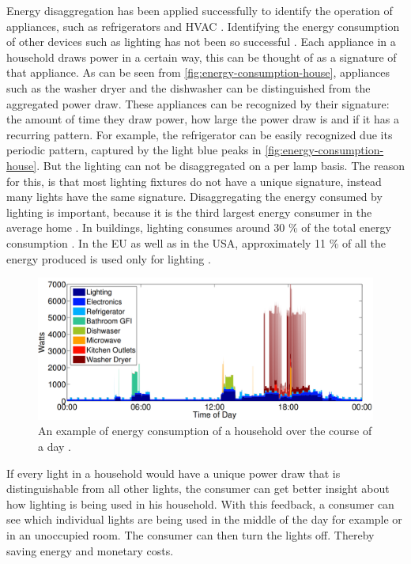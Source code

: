 Energy disaggregation has been applied successfully to identify the operation of appliances, such as refrigerators and HVAC \cite{kolter2011redd} \cite{spiegel2014energy}.
Identifying the energy consumption of other devices such as lighting has not been so successful \cite{spiegel2014energy} \cite{batra2015neighbourhood}.
Each appliance in a household draws power in a certain way, this can be thought of as a signature of that appliance.
As can be seen from \autoref{fig:energy-consumption-house}, appliances such as the washer dryer and the dishwasher can be distinguished from the aggregated power draw.
These appliances can be recognized by their signature: the amount of time they draw power, how large the power draw is and if it has a recurring pattern.
For example, the refrigerator can be easily recognized due its periodic pattern, captured by the light blue peaks in \autoref{fig:energy-consumption-house}.
But the lighting can not be disaggregated on a per lamp basis.
The reason for this, is that most lighting fixtures do not have a unique signature, instead many lights have the same signature.
Disaggregating the energy consumed by lighting is important, because it is the third largest energy consumer in the average home \cite{batra2015neighbourhood}.
In buildings, lighting consumes around 30 \% of the total energy consumption \cite{halonen2010guidebook}.
In the EU as well as in the USA, approximately 11 \% of all the energy produced is used only for lighting \cite{bertoldi2009electricity} \cite{outlook2010energy}.

\begin{figure}[t]
	\centering
	\includegraphics[width=\textwidth]{chapters/introduction-chapters/energy-consumption-house.png}
	\caption{An example of energy consumption of a household over the course of a day \cite{kolter2011redd}.}
	\label{fig:energy-consumption-house}
\end{figure}




If every light in a household would have a unique power draw that is distinguishable from all other lights, the consumer can get better insight about how lighting is being used in his household. 
With this feedback, a consumer can see which individual lights are being used in the middle of the day for example or in an unoccupied room.
The consumer can then turn the lights off.
Thereby saving energy and monetary costs.



